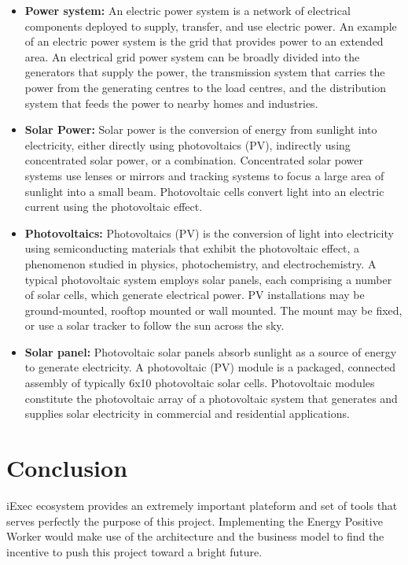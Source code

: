 \begin{itemize}
        \item \textbf{Power system:} An electric power system is a network of electrical components deployed to
        supply, transfer, and use electric power. An example of an electric power system is the grid that provides
        power to an extended area. An electrical grid power system can be broadly divided into the generators that
        supply the power, the transmission system that carries the power from the generating centres to the load
        centres, and the distribution system that feeds the power to nearby homes and
        industries\cite{power-system}.

        \item \textbf{Solar Power:} Solar power is the conversion of energy from sunlight into electricity, either
        directly using photovoltaics (PV), indirectly using concentrated solar power, or a combination.
        Concentrated solar power systems use lenses or mirrors and tracking systems to focus a large area of
        sunlight into a small beam. Photovoltaic cells convert light into an electric current using the
        photovoltaic effect\cite{solar-power}.

        \item \textbf{Photovoltaics:} Photovoltaics (PV) is the conversion of light into electricity using
        semiconducting materials that exhibit the photovoltaic effect, a phenomenon studied in physics,
        photochemistry, and electrochemistry. A typical photovoltaic system employs solar panels, each comprising
        a number of solar cells, which generate electrical power. PV installations may be ground-mounted, rooftop
        mounted or wall mounted. The mount may be fixed, or use a solar tracker to follow the sun across the
        sky\cite{photovoltaics}.

        \item \textbf{Solar panel:} Photovoltaic solar panels absorb sunlight as a source of energy to generate
        electricity. A photovoltaic (PV) module is a packaged, connected assembly of typically 6x10 photovoltaic
        solar cells. Photovoltaic modules constitute the photovoltaic array of a photovoltaic system that generates
        and supplies solar electricity in commercial and residential applications\cite{solar-panel}.
        
    \end{itemize}


\section{Conclusion}
    iExec ecosystem provides an extremely important plateform and set of tools that serves perfectly the purpose of
    this project. Implementing the Energy Positive Worker would make use of the architecture and the business
    model to find the incentive to push this project toward a bright future.